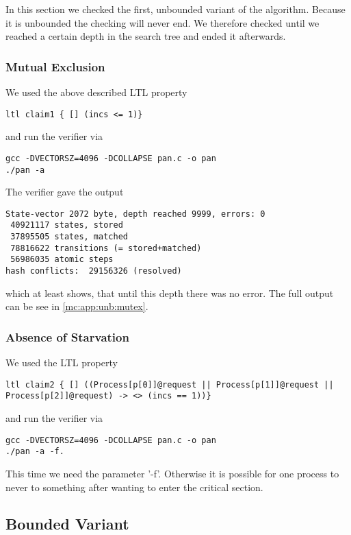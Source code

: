 \documentclass{llncs}
\begin{document}
In this section we checked the first, unbounded variant of the algorithm.
Because it is unbounded the checking will never end. We therefore checked until we reached
a certain depth in the search tree and ended it afterwards.

\subsubsection{Mutual Exclusion}

We used the above described LTL property
\begin{lstlisting}
ltl claim1 { [] (incs <= 1)}
\end{lstlisting}
and run the verifier via
\begin{lstlisting}
gcc -DVECTORSZ=4096 -DCOLLAPSE pan.c -o pan
./pan -a
\end{lstlisting}

The verifier gave the output
\begin{lstlisting}
State-vector 2072 byte, depth reached 9999, errors: 0
 40921117 states, stored
 37895505 states, matched
 78816622 transitions (= stored+matched)
 56986035 atomic steps
hash conflicts:  29156326 (resolved)
\end{lstlisting}
which at least shows, that until this depth there was no error.
The full output can be see in \ref{mc:app:unb:mutex}.

\subsubsection{Absence of Starvation}

We used the LTL property
\begin{lstlisting}
ltl claim2 { [] ((Process[p[0]]@request || Process[p[1]]@request || Process[p[2]]@request) -> <> (incs == 1))}
\end{lstlisting}
and run the verifier via
\begin{lstlisting}
gcc -DVECTORSZ=4096 -DCOLLAPSE pan.c -o pan
./pan -a -f.
\end{lstlisting}
This time we need the parameter '-f'. Otherwise it is possible for one process to never to something after wanting to enter
the critical section.
\subsection{Bounded Variant}

\end{document}
